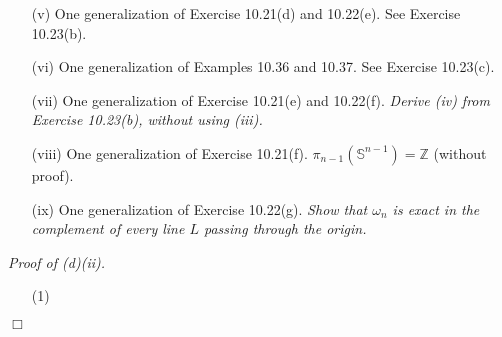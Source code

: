 \documentclass{article}
\begin{document}
\begin{enumerate}
\item[(v)]
  One generalization of Exercise 10.21(d) and 10.22(e).
  See Exercise 10.23(b).

\item[(vi)]
  One generalization of Examples 10.36 and 10.37.
  See Exercise 10.23(c).

\item[(vii)]
  One generalization of Exercise 10.21(e) and 10.22(f).
  \emph{Derive (iv) from Exercise 10.23(b), without using (iii).}

\item[(viii)]
  One generalization of Exercise 10.21(f).
  $\pi_{n-1}(\mathbb{S}^{n-1}) = \mathbb{Z}$ (without proof).

\item[(ix)]
  One generalization of Exercise 10.22(g).
  \emph{Show that $\omega_n$ is exact in the complement of every line $L$ passing
  through the origin.} \\
\end{enumerate}



\emph{Proof of (d)(ii).}
\begin{enumerate}
\item[(1)]

\end{enumerate}
$\Box$ \\
\end{document}
